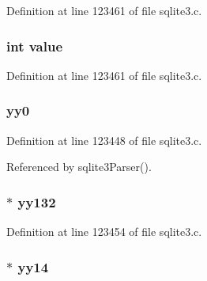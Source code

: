 Definition at line 123461 of file sqlite3.\+c.

\hypertarget{union_y_y_m_i_n_o_r_t_y_p_e_ac4f474c82e82cbb89ca7c36dd52be0ed}{}
\subsubsection[{value}]{\setlength{\rightskip}{0pt plus 5cm}int value}\label{union_y_y_m_i_n_o_r_t_y_p_e_ac4f474c82e82cbb89ca7c36dd52be0ed}


Definition at line 123461 of file sqlite3.\+c.

\hypertarget{union_y_y_m_i_n_o_r_t_y_p_e_a527c9f75bd39917886d90305da19803c}{}
\subsubsection[{yy0}]{ yy0}\label{union_y_y_m_i_n_o_r_t_y_p_e_a527c9f75bd39917886d90305da19803c}


Definition at line 123448 of file sqlite3.\+c.



Referenced by sqlite3\+Parser().

\hypertarget{union_y_y_m_i_n_o_r_t_y_p_e_a36d8a69a92bd00d6640392cedea66970}{}
\subsubsection[{yy132}]{$\ast$ yy132}\label{union_y_y_m_i_n_o_r_t_y_p_e_a36d8a69a92bd00d6640392cedea66970}


Definition at line 123454 of file sqlite3.\+c.

\hypertarget{union_y_y_m_i_n_o_r_t_y_p_e_a71fb717f0141b38b92f35b6739366677}{}
\subsubsection[{yy14}]{$\ast$ yy14}\label{union_y_y_m_i_n_o_r_t_y_p_e_a71fb717f0141b38b92f35b6739366677}


